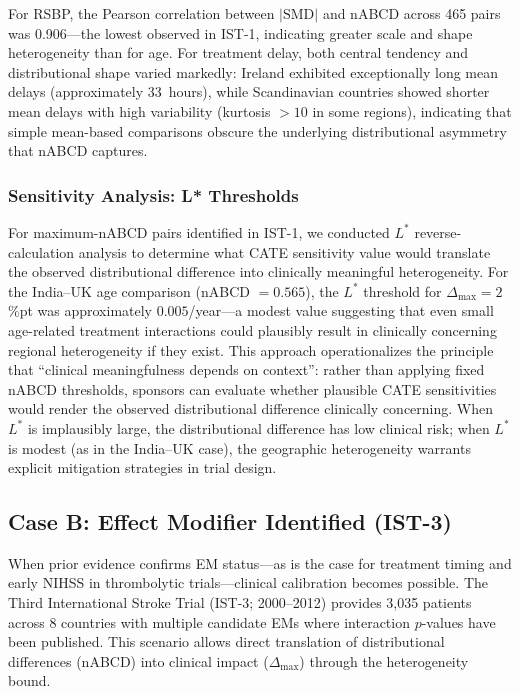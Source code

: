 \documentclass[AMA,Times1COL]{WileyNJDv5}
\begin{document}
For RSBP, the Pearson correlation between $|\text{SMD}|$ and nABCD across 465 pairs was 0.906---the lowest observed in IST-1, indicating greater scale and shape heterogeneity than for age. For treatment delay, both central tendency and distributional shape varied markedly: Ireland exhibited exceptionally long mean delays (approximately 33~hours), while Scandinavian countries showed shorter mean delays with high variability (kurtosis $> 10$ in some regions), indicating that simple mean-based comparisons obscure the underlying distributional asymmetry that nABCD captures.

\subsubsection{Sensitivity Analysis: L* Thresholds}\label{sec:case_a_sensitivity}

For maximum-nABCD pairs identified in IST-1, we conducted $L^*$ reverse-calculation analysis to determine what CATE sensitivity value would translate the observed distributional difference into clinically meaningful heterogeneity. For the India--UK age comparison (nABCD $= 0.565$), the $L^*$ threshold for $\Delta_{\max} = 2$\%pt was approximately $0.005$/year---a modest value suggesting that even small age-related treatment interactions could plausibly result in clinically concerning regional heterogeneity if they exist. This approach operationalizes the principle that ``clinical meaningfulness depends on context'': rather than applying fixed nABCD thresholds, sponsors can evaluate whether plausible CATE sensitivities would render the observed distributional difference clinically concerning. When $L^*$ is implausibly large, the distributional difference has low clinical risk; when $L^*$ is modest (as in the India--UK case), the geographic heterogeneity warrants explicit mitigation strategies in trial design.

\subsection{Case B: Effect Modifier Identified (IST-3)}\label{sec:case_b}

When prior evidence confirms EM status---as is the case for treatment timing and early NIHSS in thrombolytic trials---clinical calibration becomes possible. The Third International Stroke Trial (IST-3; 2000--2012) provides 3,035 patients across 8 countries with multiple candidate EMs where interaction $p$-values have been published. This scenario allows direct translation of distributional differences (nABCD) into clinical impact ($\Delta_{\max}$) through the heterogeneity bound.
\end{document}
